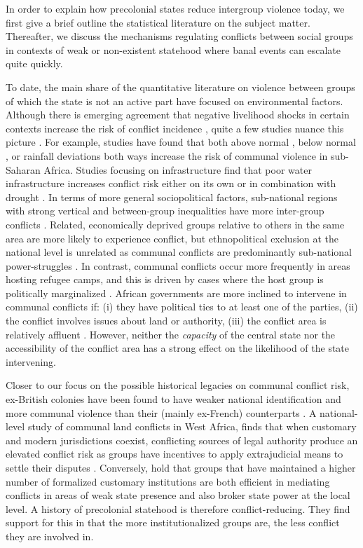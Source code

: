 In order to explain how precolonial states reduce intergroup violence today, we
first give a brief outline the statistical literature on the subject matter.
Thereafter, we discuss the mechanisms regulating conflicts between social groups
in contexts of weak or non-existent statehood where banal events can escalate 
quite quickly. 

To date, the main share of the quantitative literature on violence between
groups of which the state is not an active part have focused on environmental
factors. Although there is emerging agreement that negative livelihood shocks in
certain contexts increase the risk of conflict incidence \citep{Fjelde2012,
van_Weezel_2019, Petrova_2022}, quite a few studies nuance this picture
\cite[see][for a review]{Theisen_2017}. For example, studies have found that
both above normal \cite[see for instance][]{Theisen2012, Witsenburg2012}, below
normal \citep{Fjelde2012}, or rainfall deviations both ways
\citep{Nordkvelle_2017, Raleigh_2012} increase the risk of communal violence in
sub-Saharan Africa. Studies focusing on infrastructure find that poor water
infrastructure increases conflict risk either on its own or in combination with
drought \citep{Detges_2017, D_ring_2020}. In terms of more general
sociopolitical factors, sub-national regions with strong vertical and
between-group inequalities have more inter-group conflicts \citep{Fjelde2014}.
Related, economically deprived groups relative to others in the same area are
more likely to experience conflict, but ethnopolitical exclusion at the national
level is unrelated as communal conflicts are predominantly sub-national
power-struggles \citep{Hillesund_2017}. In contrast, communal conflicts occur
more frequently in areas hosting refugee camps, and this is driven by cases
where the host group is politically marginalized \citep{Fisk_2019}. African
governments are more inclined to intervene in communal conflicts if: (i) they
have political ties to at least one of the parties, (ii) the conflict involves
issues about land or authority, (iii) the conflict area is relatively affluent
\citep{Elfversson2015} . However, neither the \textit{capacity} of the central
state nor the accessibility of the conflict area has a strong effect on the
likelihood of the state intervening.

Closer to our focus on the possible historical legacies on communal conflict
risk, ex-British colonies have been found to have weaker national identification
and more communal violence than their (mainly ex-French) counterparts
\citep{Ali_2018}. A national-level study of communal land conflicts in West
Africa, finds that when customary and modern jurisdictions coexist, conflicting
sources of legal authority produce an elevated conflict risk as groups have
incentives to apply extrajudicial means to settle their disputes
\citep{Eck2014}. Conversely, \citet{Wig2018} hold that groups that have
maintained a higher number of formalized customary institutions are both
efficient in mediating conflicts in areas of weak state presence and also broker
state power at the local level. A history of precolonial statehood is therefore
conflict-reducing. They find support for this in that the more institutionalized
groups are, the less conflict they are involved in.

